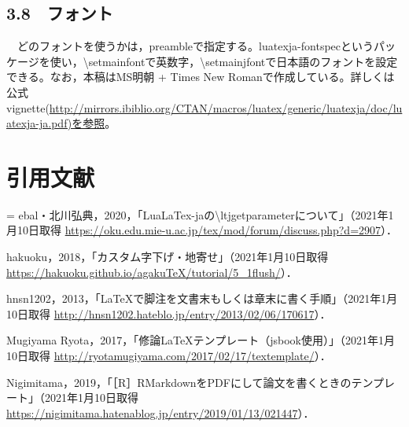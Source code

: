 \documentclass[
  a4paper]{ltjsarticle}
\newenvironment{hangall}[1]{\hangindent = #1\zw\everypar{\hangindent = #1\zw}}{}
\begin{document}
\hypertarget{ux30d5ux30a9ux30f3ux30c8}{%
\subsection{3.8　フォント}\label{ux30d5ux30a9ux30f3ux30c8}}

　どのフォントを使うかは，preambleで指定する。luatexja-fontspecというパッケージを使い，\textbackslash setmainfontで英数字，\textbackslash setmainjfontで日本語のフォントを設定できる。なお，本稿はMS明朝
+ Times New
Romanで作成している。詳しくは公式vignette(\url{http://mirrors.ibiblio.org/CTAN/macros/luatex/generic/luatexja/doc/luatexja-ja.pdf)を参照}。
　

\theendnotes

\clearpage

\setcounter{page}{1}

\hypertarget{ux5f15ux7528ux6587ux732e}{%
\section{引用文献}\label{ux5f15ux7528ux6587ux732e}}

\begin{hangall}{2}  

ebal・北川弘典，2020，「LuaLaTex-jaの\textbackslash ltjgetparameterについて」（2021年1月10日取得
\url{https://oku.edu.mie-u.ac.jp/tex/mod/forum/discuss.php?d=2907}）．

hakuoku，2018，「カスタム字下げ・地寄せ」（2021年1月10日取得
\url{https://hakuoku.github.io/agakuTeX/tutorial/5_1flush/}）．

hnsn1202，2013，「LaTeXで脚注を文書末もしくは章末に書く手順」（2021年1月10日取得
\url{http://hnsn1202.hateblo.jp/entry/2013/02/06/170617}）．

Mugiyama
Ryota，2017，「修論LaTeXテンプレート（jsbook使用）」（2021年1月10日取得
\url{http://ryotamugiyama.com/2017/02/17/textemplate/}）．

Nigimitama，2019，「［R］RMarkdownをPDFにして論文を書くときのテンプレート」（2021年1月10日取得
\url{https://nigimitama.hatenablog.jp/entry/2019/01/13/021447}）．

\end{hangall}
\end{document}
